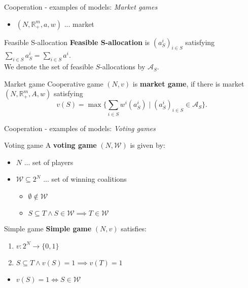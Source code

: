 \documentclass{beamer}
\begin{document}
\begin{frame}{Cooperation - examples of models: \textit{Market games}}
	\begin{itemize}
		\item $(N,\mathbb{R}^m_+,a,w)$ ... market
	\end{itemize}
	\begin{block}{Feasible S-allocation}
		\textbf{Feasible S-allocation} is $(a_S^i)_{i \in S}$ satisfying $\sum_{i \in S}a^i_S = \sum_{i \in S}a^i$.\\
		We denote the set of feasible $S$-allocations by $\mathcal{A}_S$.
	\end{block}
	\begin{block}{Market game}
		Cooperative game $(N,v)$ is \textbf{market game}, if there is market $(N,\mathbb{R}^m_+,A,w)$ satisfying
		\[
		v(S) = \max\{\sum_{i \in S}w^i(a_S^i)\mid (a_S^i)_{i \in S} \in \mathcal{A}_S\}.
		\]
	\end{block}
\end{frame}



\begin{frame}{Cooperation - examples of models: \textit{Voting games}}
    \begin{block}{Voting game}
        A \textbf{voting game} $(N,\mathcal{W})$ is given by:
        \begin{itemize}
            \item $N$ ... set of players
            \item $\mathcal{W} \subseteq 2^N$ ... set of winning coalitions
            \begin{itemize}
                \item $\emptyset \notin \mathcal{W}$
                \item $S \subseteq T \wedge S \in \mathcal{W} \implies T \in \mathcal{W}$
            \end{itemize}
        \end{itemize}
    \end{block}
    \pause
    \begin{block}{Simple game}
        \textbf{Simple game} $(N,v)$ satisfies:
        \begin{enumerate}
            \item $v\colon 2^N \to \{0,1\}$
            \item $S \subseteq T \wedge v(S)=1 \implies v(T)=1$
        \end{enumerate}
    \end{block}
    \begin{itemize}
        \pause
        \item $v(S)=1 \iff S \in \mathcal{W}$
    \end{itemize}
 
\end{frame}
\end{document}
